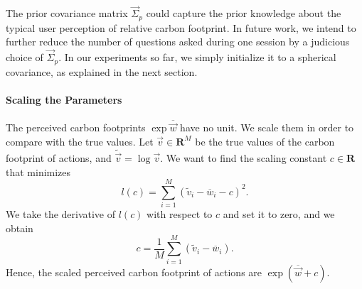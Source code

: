 The prior covariance matrix $\vec{\Sigma}_p$ could capture the prior knowledge about the typical user perception of relative carbon footprint.
In future work, we intend to further reduce the number of questions asked during one session by a judicious choice of $\vec{\Sigma}_p$.
In our experiments so far, we simply initialize it to a spherical covariance, as explained in the next section.

\paragraph{Scaling the Parameters}
The perceived carbon footprints $\exp \overline{\vec{w}}$ have no unit.
We scale them in order to compare with the true values.
Let $\vec{v} \in \mathbf{R}^M$ be the true values of the carbon footprint of actions, and $\widetilde{\vec{v}} = \log{\vec{v}}$.
We want to find the scaling constant $c \in \mathbf{R}$ that minimizes
\begin{equation*}
	l(c) = \sum_{i=1}^{M}(\widetilde{v}_i-\overline{w}_i - c)^2.
\end{equation*}
We take the derivative of $l(c)$ with respect to $c$ and set it to zero, and we obtain
\begin{equation*}
	c = \frac{1}{M}\sum_{i=1}^{M} (\widetilde{v}_i - \overline{w}_i).
\end{equation*}
Hence, the scaled perceived carbon footprint of actions are $\exp{(\overline{\vec{w}} + c)}$.
